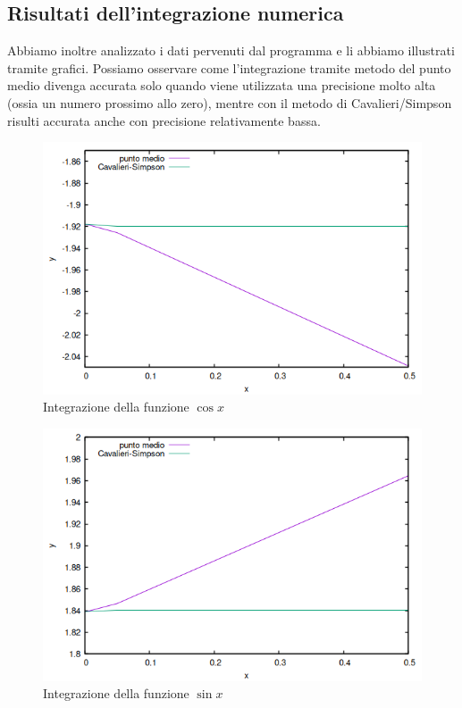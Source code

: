 \documentclass{article}
\begin{document}
\subsection{Risultati dell'integrazione numerica}
Abbiamo inoltre analizzato i dati pervenuti dal programma e li abbiamo illustrati tramite grafici. Possiamo osservare come l'integrazione tramite metodo del punto 
medio divenga accurata solo quando viene utilizzata una precisione molto alta (ossia un numero prossimo allo zero), mentre con il metodo di Cavalieri/Simpson risulti 
accurata anche con precisione relativamente bassa.
\begin{figure}[ht]
   \centering
   \includegraphics*[scale=.5]{../grafici/immagini/coseno_integrazione.png}
   \caption{Integrazione della funzione $\cos x$}
\end{figure}
\begin{figure}[ht]
   \centering
   \includegraphics*[scale=.5]{../grafici/immagini/seno_integrazione.png}
   \caption{Integrazione della funzione $\sin x$}
\end{figure}
\end{document}
